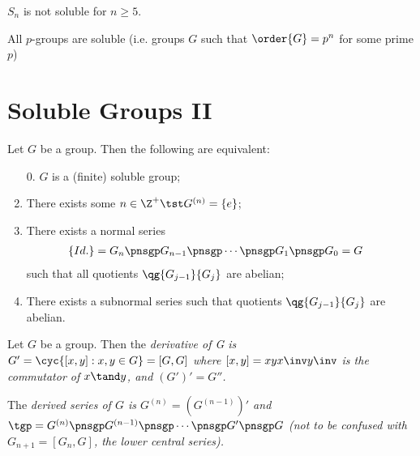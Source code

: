\documentclass{article}
\begin{document}
\begin{tcorollary}
  \( S_n \) is not soluble for \( n\geq 5 \).
\end{tcorollary}

\begin{tcorollary}
  All \( p \)-groups are soluble (i.e. groups \( G \) such that \( \order{G} = p^n \) for some prime \( p \))
\end{tcorollary}

\section{Soluble Groups II}
\begin{ttheorem}
  Let \( G \) be a group.
  Then the following are equivalent:
  \begin{enumerate}
    \item[0.] \( G \) is a (finite) soluble group;
    \item There exists some \( n\in \Z^{+} \tst G^{(n)} = \left\{ e \right\} \);
    \item There exists a normal series \begin{align*}
      \left\{ Id. \right\} &= G_n \pnsgp G_{n-1} \pnsgp \cdots \pnsgp G_1 \pnsgp G_0 = G
    \end{align*}
    such that all quotients \( \qg{G_{j-1}}{G_j} \) are abelian;
    \item There exists a subnormal series such that quotients \( \qg{G_{j-1}}{G_j} \) are abelian.
  \end{enumerate}
\end{ttheorem}

\begin{tdefinition}
  Let \( G \) be a group.
  Then the \it{derivative of G} is \( G' = \cyc{[x,y] : x,y\in G} = [G,G] \) where \( [x,y] = xyx\inv y\inv \) is the \it{commutator} of \( x\tand y \), and \( (G')' = G'' \).
\end{tdefinition}



\begin{tdefinition}
  The \it{derived series} of \( G \) is \( G^{(n)} = \left( G^{(n-1)} \right)' \) and \( \tgp = G^{(n)} \pnsgp G^{(n-1)} \pnsgp \cdots \pnsgp G' \pnsgp G \) (not to be confused with \( G_{n+1} = [G_n, G]\), the \it{lower central series}).
\end{tdefinition}
\end{document}
